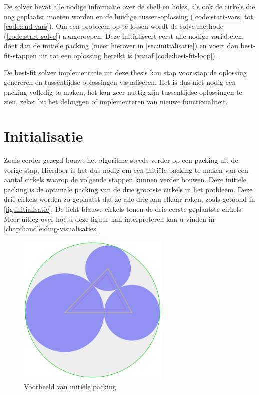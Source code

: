 \documentclass[12pt,a4paper,oneside]{book}
\begin{document}
De solver bevat alle nodige informatie over de shell en holes, als ook de cirkels die nog geplaatst moeten worden en de huidige tussen-oplossing (\autoref{code:start-vars} tot \autoref{code:end-vars}).
Om een probleem op te lossen wordt de solve methode (\autoref{code:start-solve}) aangeroepen.
Deze initialiseert eerst alle nodige variabelen, doet dan de initiële packing (meer hierover in \autoref{sec:initialisatie}) en voert dan best-fit-stappen uit tot een oplossing bereikt is (vanaf \autoref{code:best-fit-loop}).

De best-fit solver implementatie uit deze thesis kan stap voor stap de oplossing genereren en tussentijdse oplossingen visualiseren.
Het is dus niet nodig een packing volledig te maken, het kan zeer nuttig zijn tussentijdse oplossingen te zien, zeker bij het debuggen of implementeren van nieuwe functionaliteit.

\section{Initialisatie} \label{sec:initialisatie}

Zoals eerder gezegd bouwt het algoritme steeds verder op een packing uit de vorige stap.
Hierdoor is het dus nodig om een initiële packing te maken van een aantal cirkels waarop de volgende stappen kunnen verder bouwen.
Deze initiële packing is de optimale packing van de drie grootste cirkels in het probleem.
Deze drie cirkels worden zo geplaatst dat ze alle drie aan elkaar raken, zoals getoond in \autoref{fig:initialisatie}.
De licht blauwe cirkels tonen de drie eerste-geplaatste cirkels.
Meer uitleg over hoe u deze figuur kan interpreteren kan u vinden in \autoref{chap:handleiding-visualisaties}

\begin{figure}
  \centering
  \includegraphics[width=0.65\textwidth]{initialisatie.png}
  \caption{Voorbeeld van initiële packing} \label{fig:initialisatie} 
\end{figure}
\end{document}
